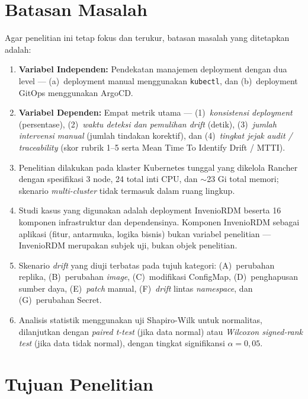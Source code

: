 \section{Batasan Masalah}

Agar penelitian ini tetap fokus dan terukur, batasan masalah yang ditetapkan adalah:

\begin{enumerate}
  \item \textbf{Variabel Independen:} Pendekatan manajemen deployment dengan dua level --- (a)~deployment manual menggunakan \texttt{kubectl}, dan (b)~deployment GitOps menggunakan ArgoCD.
  
  \item \textbf{Variabel Dependen:} Empat metrik utama --- (1)~\textit{konsistensi deployment} (persentase), (2)~\textit{waktu deteksi dan pemulihan drift} (detik), (3)~\textit{jumlah intervensi manual} (jumlah tindakan korektif), dan (4)~\textit{tingkat jejak audit / traceability} (skor rubrik 1--5 serta Mean Time To Identify Drift / MTTI).
  
  \item Penelitian dilakukan pada klaster Kubernetes tunggal yang dikelola Rancher dengan spesifikasi 3 node, 24 total inti CPU, dan $\sim$23 Gi total memori; skenario \textit{multi-cluster} tidak termasuk dalam ruang lingkup.
  
  \item Studi kasus yang digunakan adalah deployment InvenioRDM beserta 16 komponen infrastruktur dan dependensinya. Komponen InvenioRDM sebagai aplikasi (fitur, antarmuka, logika bisnis) bukan variabel penelitian --- InvenioRDM merupakan subjek uji, bukan objek penelitian.
  
  \item Skenario \textit{drift} yang diuji terbatas pada tujuh kategori: (A)~perubahan replika, (B)~perubahan \textit{image}, (C)~modifikasi ConfigMap, (D)~penghapusan sumber daya, (E)~\textit{patch} manual, (F)~\textit{drift} lintas \textit{namespace}, dan (G)~perubahan Secret.
  
  \item Analisis statistik menggunakan uji Shapiro-Wilk untuk normalitas, dilanjutkan dengan \textit{paired t-test} (jika data normal) atau \textit{Wilcoxon signed-rank test} (jika data tidak normal), dengan tingkat signifikansi $\alpha = 0,05$.
\end{enumerate}

\section{Tujuan Penelitian}

